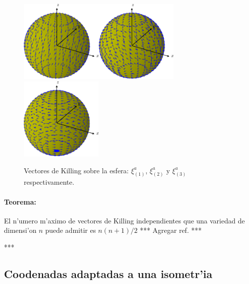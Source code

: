 \begin{center}
\begin{figure}[H]
\centerline{\includegraphics[height=4cm]{fig/fig-KS2x.pdf}\hfill\includegraphics[height=4cm]{fig/fig-KS2y.pdf}\hfill\includegraphics[height=4cm]{fig/fig-KS2z.pdf}}
\caption{Vectores de Killing sobre la esfera: 
$\xi^a_{(1)}$, $\xi^a_{(2)}$ y $\xi^a_{(3)}$ respectivamente.}
\label{KS2}
\end{figure}
\end{center}

\paragraph{Teorema:} El n'umero m'aximo de vectores de Killing independientes que una variedad de dimensi'on $n$ puede admitir es $n(n+1)/2$ *** Agregar ref. ***

***
\subsection{Coodenadas adaptadas a una isometr'ia}

